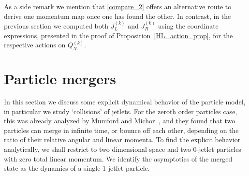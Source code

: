\documentclass[12pt]{amsart}
\begin{document}
As a side remark we mention that \eqref{compare_2} offers an alternative route to derive one momentum map once one has found the other. In contrast,  in the previous section we computed both $J_L^{(k)}$ and $J_R^{(k)}$ using the coordinate expressions, presented in the proof of Proposition~\ref{HL_action_prop}, for the respective actions on $Q^{(k)}_N$.


\section{Particle mergers}
\label{sec:collisions}

In this section we discuss some explicit dynamical behavior of the
particle model, in particular we study `collisions' of jetlets. For
the zeroth order particles case, this was already analyzed by Mumford
and Michor~\cite{MumfordMichor2013}, and they found that two
particles can merge in infinite time, or bounce off each other,
depending on the ratio of their relative angular and linear momenta.
To find the explicit behavior analytically, we shall restrict to two
dimensional space and two $0$-jetlet particles with zero total linear
momentum. We identify the asymptotics of the merged state as the
dynamics of a single $1$-jetlet particle.
\end{document}
